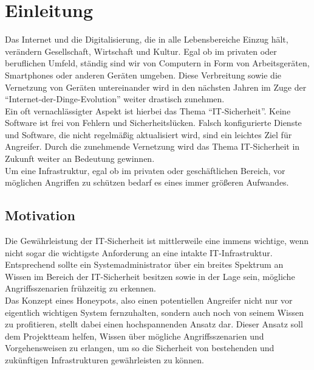 \chapter{Einleitung}
\label{ch:einleitung}

Das Internet und die Digitalisierung, die in alle Lebensbereiche Einzug hält, verändern Gesellschaft, Wirtschaft und Kultur. Egal ob im privaten oder beruflichen Umfeld, ständig sind wir von Computern in Form von Arbeitsgeräten, Smartphones oder anderen Geräten umgeben. Diese Verbreitung sowie die Vernetzung von Geräten untereinander wird in den nächsten Jahren im Zuge der "`Internet-der-Dinge-Evolution"' weiter drastisch zunehmen.\\


Ein oft vernachlässigter Aspekt ist hierbei das Thema "`IT-Sicherheit"'. Keine Software ist frei von Fehlern und Sicherheitslücken. Falsch konfigurierte Dienste und Software, die nicht regelmäßig aktualisiert wird, sind ein leichtes Ziel für Angreifer. Durch die zunehmende Vernetzung wird das Thema IT-Sicherheit in Zukunft weiter an Bedeutung gewinnen.\\

Um eine Infrastruktur, egal ob im privaten oder geschäftlichen Bereich, vor möglichen Angriffen zu schützen bedarf es eines immer größeren Aufwandes.



\section{Motivation}
\label{sec:Motivation}

Die Gewährleistung der IT-Sicherheit ist mittlerweile eine immens wichtige, wenn nicht sogar die wichtigste Anforderung an eine intakte IT-Infrastruktur. Entsprechend sollte ein Systemadministrator über ein breites Spektrum an Wissen im Bereich der IT-Sicherheit besitzen sowie in der Lage sein, mögliche Angriffsszenarien frühzeitig zu erkennen.\\


Das Konzept eines Honeypots, also einen potentiellen Angreifer nicht nur vor eigentlich wichtigen System fernzuhalten, sondern auch noch von seinem Wissen zu profitieren, stellt dabei einen hochspannenden Ansatz dar. 
Dieser Ansatz soll dem Projektteam helfen, Wissen über mögliche Angriffsszenarien und Vorgehensweisen zu erlangen, um so die Sicherheit von bestehenden und zukünftigen Infrastrukturen gewährleisten zu können.

